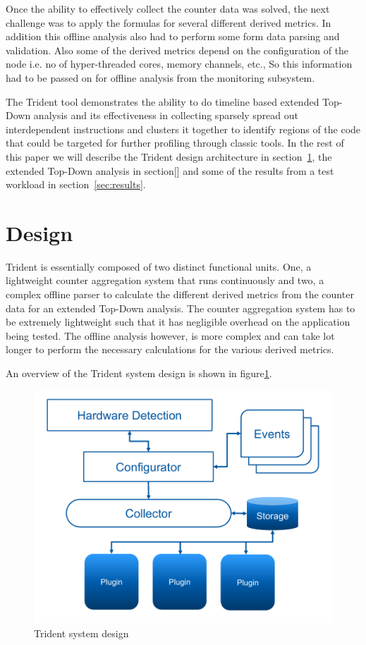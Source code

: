 \documentclass{webofc}
\begin{document}
Once the ability to effectively collect the counter data was solved, the next challenge was to apply the formulas for several different derived metrics. In addition this offline analysis also had to perform some form data parsing and validation. Also some of the derived metrics depend on the configuration of the node i.e. no of hyper-threaded cores, memory channels, etc., So this information had to be passed on for offline analysis from the monitoring subsystem. 

The Trident tool demonstrates the ability to do timeline based extended Top-Down analysis and its effectiveness in collecting sparsely spread out interdependent instructions and clusters it together to identify regions of the code that could be targeted for further profiling through classic tools. In the rest of this paper we will describe the Trident design architecture in section~\ref{sec:design}, the extended Top-Down analysis in section[] and some of the results from a test workload in section~\ref{sec:results}.


\section{Design}
\label{sec:design}

Trident is essentially composed of two distinct functional units. One, a lightweight counter aggregation system that runs continuously and two, a complex offline parser to calculate the different derived metrics from the counter data for an extended Top-Down analysis. The counter aggregation system has to be extremely lightweight such that it has negligible overhead on the application being tested. The offline analysis however, is more complex and can take lot longer to perform the necessary calculations for the various derived metrics. 

An overview of the Trident system design is shown in figure\ref{fig:design}.

\begin{figure}
  \centering
  \includegraphics[width=0.7\linewidth]{Design.pdf}
\caption{Trident system design}
\label{fig:design}
\end{figure}
\end{document}
